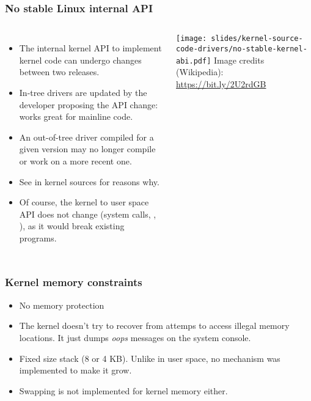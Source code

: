 \begin{frame}
  \frametitle{No stable Linux internal API}
  \begin{columns}
    \begin{itemize}
    \item The internal kernel API to implement kernel code can undergo
      changes between two releases.
    \item In-tree drivers are updated by the developer proposing the API
      change: works great for mainline code.
    \item An out-of-tree driver compiled for a given version may no
      longer compile or work on a more recent one.
    \item See  in kernel sources for
      reasons why.
    \item Of course, the kernel to user space API does not change (system
      calls, , ), as it would break existing
      programs.
    \end{itemize}
    \texttt{[image: slides/kernel-source-code-drivers/no-stable-kernel-abi.pdf]}
    \scriptsize
    \vfill
    Image credits (Wikipedia):\\
    \url{https://bit.ly/2U2rdGB}
  \end{columns}
\end{frame}

\begin{frame}
  \frametitle{Kernel memory constraints}
  \begin{itemize}
  \item No memory protection
  \item The kernel doesn't try to recover from attemps to access illegal
    memory locations. It just dumps {\em oops} messages on the system console.
  \item Fixed size stack (8 or 4 KB). Unlike in user space, no mechanism
    was implemented to make it grow.
  \item Swapping is not implemented for kernel memory either.
  \end{itemize}
\end{frame}

